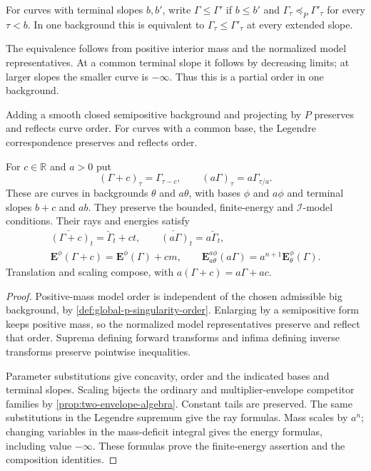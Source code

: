 \begin{definition}\label{def:test-curve-order}
For curves with terminal slopes $b,b'$, write $\Gamma\leq\Gamma'$ if $b\leq b'$ and $\Gamma_\tau\preceq_P\Gamma'_\tau$ for every $\tau<b$. In one background this is equivalent to $\Gamma_\tau\leq\Gamma'_\tau$ at every extended slope.
\end{definition}
The equivalence follows from positive interior mass and the normalized model representatives. At a common terminal slope it follows by decreasing limits; at larger slopes the smaller curve is $-\infty$. Thus this is a partial order in one background.

\begin{proposition}\label{prop:test-curve-order-and-affine-operations}
Adding a smooth closed semipositive background and projecting by $P$ preserves and reflects curve order. For curves with a common base, the Legendre correspondence preserves and reflects order.

For $c\in\mathbb R$ and $a>0$ put
\[
 (\Gamma+c)_\tau=\Gamma_{\tau-c},\qquad
                  (a\Gamma)_\tau=a\Gamma_{\tau/a}.
\]
These are curves in backgrounds $\theta$ and $a\theta$, with bases $\phi$ and $a\phi$ and terminal slopes $b+c$ and $ab$. They preserve the bounded, finite-energy and $\mathcal I$-model conditions. Their rays and energies satisfy
\[
 \begin{gathered}
 \check{(\Gamma+c)}_t=\check\Gamma_t+ct,\qquad
                         \check{(a\Gamma)}_t=a\check\Gamma_t,\\
 \mathbf E^\phi(\Gamma+c)=\mathbf E^\phi(\Gamma)+cm,\qquad
 \mathbf E^{a\phi}_{a\theta}(a\Gamma)
                         =a^{n+1}\mathbf E^\phi_\theta(\Gamma).
 \end{gathered}
\]
Translation and scaling compose, with
$a(\Gamma+c)=a\Gamma+ac$.
\end{proposition}
\begin{proof}
Positive-mass model order is independent of the chosen admissible big background, by \cref{def:global-p-singularity-order}. Enlarging by a semipositive form keeps positive mass, so the normalized model representatives preserve and reflect that order. Suprema defining forward transforms and infima defining inverse transforms preserve pointwise inequalities.

Parameter substitutions give concavity, order and the indicated bases and terminal slopes. Scaling bijects the ordinary and multiplier-envelope competitor families by \cref{prop:two-envelope-algebra}. Constant tails are preserved. The same substitutions in the Legendre supremum give the ray formulas. Mass scales by $a^n$; changing variables in the mass-deficit integral gives the energy formulas, including value $-\infty$. These formulas prove the finite-energy assertion and the composition identities.
\end{proof}

